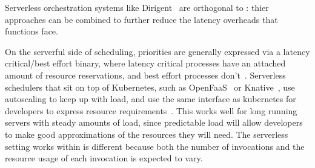 Serverless orchestration systems like Dirigent~\cite{dirigent} are orthogonal to
\sys{}: thier approaches can be combined to further reduce the latency overheads
that functions face.

On the serverful side of scheduling, priorities are generally expressed via a
latency critical/best effort binary, where latency critical processes have an
attached amount of resource reservations, and best effort processes
don't~\cite{kubernetes-lc-be}. Serverless schedulers that sit on top of
Kubernetes, such as OpenFaaS~\cite{openfaas} or Knative~\cite{knative}, use
autoscaling to keep up with load, and use the same interface as kubernetes for
developers to express resource requirements~\cite{knative-res, openfaas-res}.
This works well for long running servers with steady amounts of load, since
predictable load will allow developers to make good approximations of the
resources they will need. The serverless setting \sys{} works within is
different because both the number of invocations and the resource usage of each
invocation is expected to vary. 
